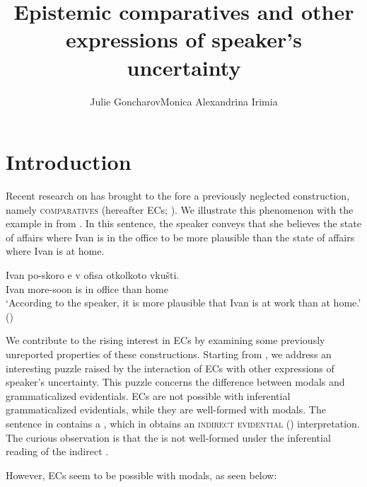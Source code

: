 \documentclass[output=paper,colorlinks,citecolor=brown,newtxmath]{langsci/langscibook}
\title{Epistemic comparatives and other expressions of speaker's uncertainty}
\author{Julie Goncharov\affiliation{Hebrew University of Jerusalem / University of Göttingen}\orcid{}\lastand Monica Alexandrina Irimia\affiliation{University of Modena and Reggio Emilia}\orcid{0000-0003-3733-8163}}
\begin{document}
\maketitle%
\section{Introduction}\label{sect:intro}

Recent research on  has brought to the fore a previously neglected construction, namely \textsc{ comparatives} (hereafter ECs; \citealt{finkra14,herrub14}). We illustrate this phenomenon with the example in  from . In this sentence, the speaker conveys that she believes the state of affairs where Ivan is in the office to be more plausible than the state of affairs where Ivan is at home.

	\ea \gll Ivan	po-skoro	e 	v	ofisa	otkolkoto vkušti.\\
	Ivan more-soon	is	in	office	than home \\
      \glt `According to the speaker, it is more plausible that Ivan is at work than at home.'	\hfill ()	  \label{BulgEC}
        \z

\noindent We contribute to the rising interest in ECs by examining some previously unreported properties of these constructions. Starting from , we address an interesting puzzle raised by the interaction of ECs with other expressions of speaker's uncertainty. This puzzle  concerns the difference between  modals and grammaticalized evidentials. ECs are not possible with inferential grammaticalized evidentials, while they are well-formed with  modals. The sentence in  contains a , which in  obtains an \textsc{indirect evidential} () interpretation. The curious observation is that the  is not well-formed under the inferential reading of the indirect .


 	\z

\noindent However, ECs seem to be possible with  modals, as seen below:
\end{document}
